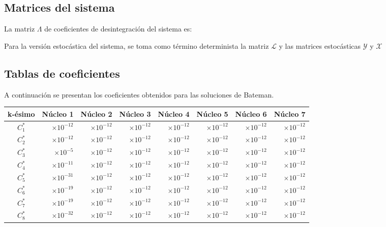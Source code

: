 \subsection{Matrices del sistema}
La matriz $\Lambda$ de coeficientes de desintegración del sistema es:

Para la versión estocástica del sistema, se toma como término determinista la matriz $\mathcal{L}$ y las matrices estocásticas $\mathcal{Y}$ y $\mathcal{X}$ 
\subsection{Tablas de coeficientes}
A continuación se presentan los coeficientes obtenidos para las soluciones de Bateman. 
\begin{center}
\begin{tabular}[h]{|c|r|r|r|r|r|r|r|}
    \hline
    k-ésimo & \multicolumn{1}{c|}{Núcleo 1} & \multicolumn{1}{c|}{Núcleo 2} & \multicolumn{1}{c|}{Núcleo 3} & \multicolumn{1}{c|}{Núcleo 4} & \multicolumn{1}{c|}{Núcleo 5} & \multicolumn{1}{c|}{Núcleo 6} & \multicolumn{1}{c|}{Núcleo 7} \\\hline\hline
    $C_1^*$ & $\times 10^{-12}$ & $\times 10^{-12}$ & $\times 10^{-12}$ & $\times 10^{-12}$ & $\times 10^{-12}$ & $\times 10^{-12}$ & $\times 10^{-12}$ \\
    $C_2^*$ & $\times 10^{-12}$& $\times 10^{-12}$ & $\times 10^{-12}$ & $\times 10^{-12}$ & $\times 10^{-12}$ & $\times 10^{-12}$ & $\times 10^{-12}$ \\
    $C_3^*$ & $\times 10^{-5}$& $\times 10^{-12}$ & $\times 10^{-12}$ & $\times 10^{-12}$ & $\times 10^{-12}$ & $\times 10^{-12}$ & $\times 10^{-12}$ \\
    $C_4^*$ & $\times 10^{-11}$& $\times 10^{-12}$ & $\times 10^{-12}$ & $\times 10^{-12}$ & $\times 10^{-12}$ & $\times 10^{-12}$ & $\times 10^{-12}$ \\
    $C_5^*$ & $\times 10^{-31}$& $\times 10^{-12}$ & $\times 10^{-12}$ & $\times 10^{-12}$ & $\times 10^{-12}$ & $\times 10^{-12}$ & $\times 10^{-12}$ \\
    $C_6^*$ & $\times 10^{-19}$& $\times 10^{-12}$ & $\times 10^{-12}$ & $\times 10^{-12}$ & $\times 10^{-12}$ & $\times 10^{-12}$ & $\times 10^{-12}$  \\
    $C_7^*$ & $\times 10^{-19}$& $\times 10^{-12}$ & $\times 10^{-12}$ & $\times 10^{-12}$ & $\times 10^{-12}$ & $\times 10^{-12}$ & $\times 10^{-12}$  \\
    $C_8^*$ & $\times 10^{-32}$& $\times 10^{-12}$ & $\times 10^{-12}$ & $\times 10^{-12}$ & $\times 10^{-12}$ & $\times 10^{-12}$ & $\times 10^{-12}$  \\

\end{tabular}
\end{center}
